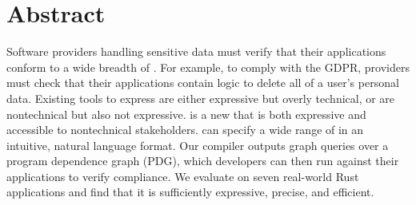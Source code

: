 \chapter*{Abstract}

%
Software providers handling sensitive data must verify that their applications conform to a wide breadth of \policies.
%
For example, to comply with the GDPR, providers must check that their applications contain logic to delete all of a user's personal data.
% 
Existing tools to express \policies{} are either expressive but overly technical, or are nontechnical but also not expressive.
%
\syslang{} is a new \policylang{} that is both expressive and accessible to nontechnical stakeholders.
%
\syslang{} can specify a wide range of \policies{} in an intuitive, natural language format.
%
Our \syslang{} compiler outputs graph queries over a program dependence graph (PDG),
which developers can then run against their applications to verify compliance.
%
We evaluate \syslang{} on seven real-world Rust applications and find that it is
sufficiently expressive, precise, and efficient.
